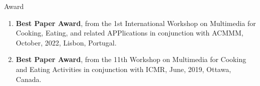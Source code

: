\begin{rSection}{Award}
\begin{enumerate}
    \item {\bf Best Paper Award}, from the 1st International Workshop on Multimedia for Cooking, Eating, and related APPlications in conjunction with ACMMM, October, 2022, Lisbon, Portugal.
    \item {\bf Best Paper Award}, from the 11th Workshop on Multimedia for Cooking and Eating Activities in conjunction with ICMR, June, 2019, Ottawa, Canada.
\end{enumerate}
\end{rSection}